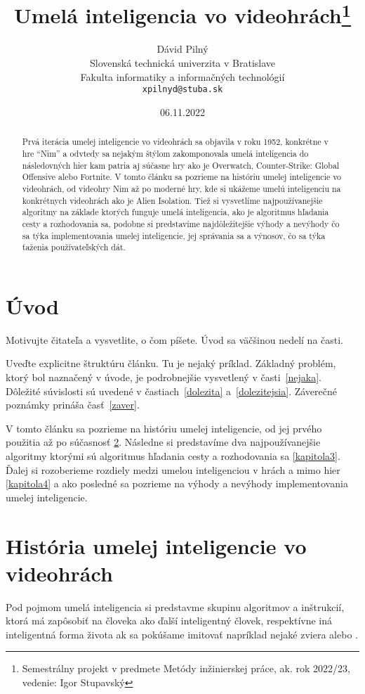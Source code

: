 \documentclass[10pt,oneside,slovak,a4paper]{article}
\title{Umelá inteligencia vo videohrách\thanks{Semestrálny projekt v predmete Metódy inžinierskej práce, ak. rok 2022/23, vedenie: Igor Stupavský}} %
\author{Dávid Pilný\\[2pt]
	{\small Slovenská technická univerzita v Bratislave}\\
	{\small Fakulta informatiky a informačných technológií}\\
	{\small \texttt{xpilnyd@stuba.sk}}
	}
\date{\small 06.11.2022} %
\begin{document}
\maketitle

\begin{abstract}
Prvá iterácia umelej inteligencie vo videohrách sa objavila v roku 1952, konkrétne v hre “Nim” a odvtedy sa nejakým štýlom zakomponovala umelá inteligencia do následovných hier kam patria aj súčasne hry ako je Overwatch, Counter-Strike: Global Offensive alebo Fortnite.
V tomto článku sa pozrieme na históriu umelej inteligencie vo videohrách, od videohry Nim až po moderné hry, kde si ukážeme umelú inteligenciu na konkrétnych videohrách ako je Alien Isolation. 
Tiež si vysvetlíme najpoužívanejšie algoritmy na základe ktorých funguje umelá inteligencia, ako je algoritmus hľadania cesty a rozhodovania sa, podobne si predstavíme najdôležitejšie výhody a nevýhody čo sa týka implementovania umelej inteligencie, jej správania sa a výnosov, čo sa týka ťaženia používateľských dát.
\end{abstract}



\section{Úvod} \label{kapitola1}

Motivujte čitateľa a vysvetlite, o čom píšete. Úvod sa väčšinou nedelí na časti.

Uveďte explicitne štruktúru článku. Tu je nejaký príklad.
Základný problém, ktorý bol naznačený v úvode, je podrobnejšie vysvetlený v časti~\ref{nejaka}.
Dôležité súvislosti sú uvedené v častiach~\ref{dolezita} a~\ref{dolezitejsia}.
Záverečné poznámky prináša časť~\ref{zaver}.

V tomto článku sa pozrieme na históriu umelej inteligencie, od jej prvého použitia až po súčasnosť \ref{kapitola2}. Následne si predstavíme dva najpoužívanejšie algoritmy ktorými sú algoritmus hľadania cesty a rozhodovania sa \ref {kapitola3}. Ďalej si rozoberieme rozdiely medzi umelou inteligenciou v hrách a mimo hier \ref{kapitola4} a ako posledné sa pozrieme na výhody a nevýhody implementovania umelej inteligencie.



\section{História umelej inteligencie vo videohrách} \label{kapitola2}
Pod pojmom umelá inteligencia si predstavme skupinu algoritmov a inštrukcií, ktorá má zapôsobiť na človeka ako ďalší inteligentný človek, respektívne iná inteligentná forma života ak sa pokúšame imitovať napríklad nejaké zviera alebo .
\end{document}
